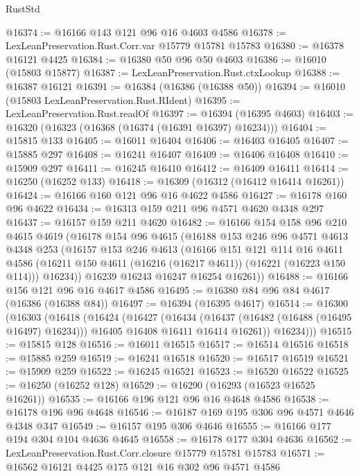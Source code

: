 \begin{lexlean}{RustStd}
\begin{coremodule}
@16374 := @16166 @143 @121 @96 @16 @4603 @4586
@16378 := LexLeanPreservation.Rust.Corr.var @15779 @15781 @15783
@16380 := @16378 @16121 @4425
@16384 := @16380 @50 @96 @50 @4603
@16386 := @16010 (@15803 @15877)
@16387 := LexLeanPreservation.Rust.ctxLookup
@16388 := @16387 @16121
@16391 := @16384 (@16386 (@16388 @50))
@16394 := @16010 (@15803 LexLeanPreservation.Rust.RIdent)
@16395 := LexLeanPreservation.Rust.readOf
@16397 := @16394 (@16395 @4603)
@16403 := @16320 (@16323 (@16368 (@16374 (@16391 @16397) @16234)))
@16404 := @15815 @133
@16405 := @16011 @16404
@16406 := @16403 @16405
@16407 := @15885 @297
@16408 := @16241 @16407
@16409 := @16406 @16408
@16410 := @15909 @297
@16411 := @16245 @16410
@16412 := @16409 @16411
@16414 := @16250 (@16252 @133)
@16418 := @16309 (@16312 (@16412 @16414 @16261))
@16424 := @16166 @160 @121 @96 @16 @4622 @4586
@16427 := @16178 @160 @96 @4622
@16434 := @16313 @159 @211 @96 @4571 @4620 @4348 @297
@16437 := @16157 @159 @211 @4620
@16482 := @16166
    @154
    @158
    @96
    @210
    @4615
    @4619
    (@16178
      @154
      @96
      @4615
      (@16188
        @153
        @246
        @96
        @4571
        @4613
        @4348
        @253
        (@16157
          @153
          @246
          @4613
          (@16166
            @151
            @121
            @114
            @16
            @4611
            @4586
            (@16211 @150 @4611 (@16216 (@16217 @4611)) (@16221 (@16223 @150 @114)))
            @16234))
        @16239
        @16243
        @16247
        @16254
        @16261))
@16488 := @16166 @156 @121 @96 @16 @4617 @4586
@16495 := @16380 @84 @96 @84 @4617 (@16386 (@16388 @84))
@16497 := @16394 (@16395 @4617)
@16514 := @16300
    (@16303
      (@16418
        (@16424
          (@16427
            (@16434
              (@16437 (@16482 (@16488 (@16495 @16497) @16234)))
              @16405
              @16408
              @16411
              @16414
              @16261))
          @16234)))
@16515 := @15815 @128
@16516 := @16011 @16515
@16517 := @16514 @16516
@16518 := @15885 @259
@16519 := @16241 @16518
@16520 := @16517 @16519
@16521 := @15909 @259
@16522 := @16245 @16521
@16523 := @16520 @16522
@16525 := @16250 (@16252 @128)
@16529 := @16290 (@16293 (@16523 @16525 @16261))
@16535 := @16166 @196 @121 @96 @16 @4648 @4586
@16538 := @16178 @196 @96 @4648
@16546 := @16187 @169 @195 @306 @96 @4571 @4646 @4348 @347
@16549 := @16157 @195 @306 @4646
@16555 := @16166 @177 @194 @304 @104 @4636 @4645
@16558 := @16178 @177 @304 @4636
@16562 := LexLeanPreservation.Rust.Corr.closure @15779 @15781 @15783
@16571 := @16562 @16121 @4425 @175 @121 @16 @302 @96 @4571 @4586

\end{coremodule}
\end{lexlean}
